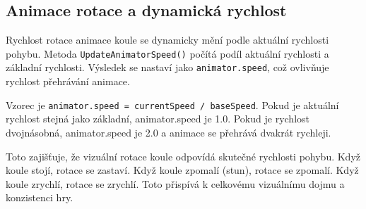 \subsection{Animace rotace a dynamická rychlost}

Rychlost rotace animace koule se dynamicky mění podle aktuální rychlosti pohybu. Metoda \texttt{UpdateAnimatorSpeed()} počítá podíl aktuální rychlosti a základní rychlosti. Výsledek se nastaví jako \texttt{animator.speed}, což ovlivňuje rychlost přehrávání animace.

Vzorec je \texttt{animator.speed = currentSpeed / baseSpeed}. Pokud je aktuální rychlost stejná jako základní, animator.speed je 1.0. Pokud je rychlost dvojnásobná, animator.speed je 2.0 a animace se přehrává dvakrát rychleji.

Toto zajišťuje, že vizuální rotace koule odpovídá skutečné rychlosti pohybu. Když koule stojí, rotace se zastaví. Když koule zpomalí (stun), rotace se zpomalí. Když koule zrychlí, rotace se zrychlí. Toto přispívá k celkovému vizuálnímu dojmu a konzistenci hry.